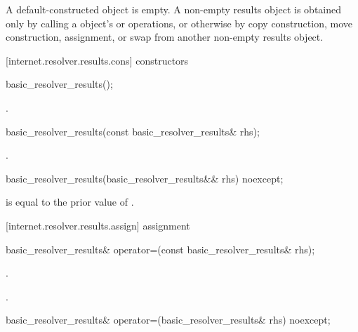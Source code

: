 \pnum
A default-constructed  object is empty. A non-empty results object is obtained only by calling a  object's  or  operations, or otherwise by copy construction, move construction, assignment, or swap from another non-empty results object.


[internet.resolver.results.cons]{ constructors}

\begin{itemdecl}
basic_resolver_results();
\end{itemdecl}

\begin{itemdescr}
\pnum
\postconditions {}.
\end{itemdescr}

\begin{itemdecl}
basic_resolver_results(const basic_resolver_results& rhs);
\end{itemdecl}

\begin{itemdescr}
\pnum
\postconditions {}.
\end{itemdescr}

\begin{itemdecl}
basic_resolver_results(basic_resolver_results&& rhs) noexcept;
\end{itemdecl}

\begin{itemdescr}
\pnum
\postconditions {} is equal to the prior value of .
\end{itemdescr}



[internet.resolver.results.assign]{ assignment}

\begin{itemdecl}
basic_resolver_results& operator=(const basic_resolver_results& rhs);
\end{itemdecl}

\begin{itemdescr}
\pnum
\postconditions {}.

\pnum
\returns {}.
\end{itemdescr}

\begin{itemdecl}
basic_resolver_results& operator=(basic_resolver_results& rhs) noexcept;
\end{itemdecl}

